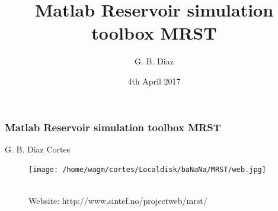 \documentclass{beamer}
\title[BaNaNa Talk]{Matlab Reservoir simulation toolbox MRST}
\author{G. B. Diaz}
\date{4th April 2017}
\begin{document}
{
}





\begin{frame}[shrink=0.2]\frametitle{Matlab Reservoir simulation toolbox MRST}
		\centering
		{
		
		\begin{minipage}{0.7\textwidth}
		G. B. Diaz Cortes\\
		

		\end{minipage}
		}
		
		\centering
		{
		\begin{figure}
		\begin{minipage}{.5\textwidth}
 \centering
\texttt{[image: /home/wagm/cortes/Localdisk/baNaNa/MRST/web.jpg]}

\end{minipage}
{\\Website: http://www.sintef.no/projectweb/mrst/}
\end{figure}
		}
\end{frame}
\end{document}
